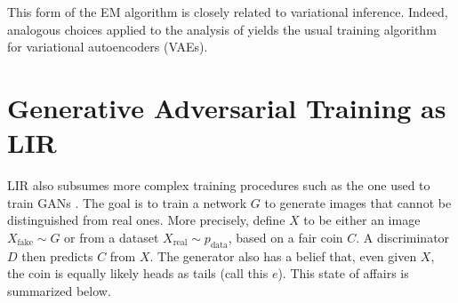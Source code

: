 This form of the EM algorithm is closely related to variational inference.
Indeed, analogous choices applied to the analysis of \citet{one-true-loss}
yields the usual training algorithm for variational autoencoders (VAEs).
\section{Generative Adversarial Training as LIR}
\def\pdata{p_{\mathrm{data}}}
\def\real{{\mathrm{real}}}
\def\fake{{\mathrm{fake}}}
LIR also subsumes more complex training procedures such as the one used to train
GANs \citep{goodfellow2020generative}.
The goal is to train a network $G$ to generate images that cannot be distinguished
    from real ones.
%
More precisely, define $X$ to be either an image $X_{\fake}\sim G$ or from a dataset
$X_\real \sim \pdata$, based on a fair coin $C$.
A discriminator $D$ then predicts $C$ from $X$.
%
The generator also has a belief that, even given $X$, the coin is equally likely
heads as tails (call this $e$).
This state of affairs is summarized below.
%
